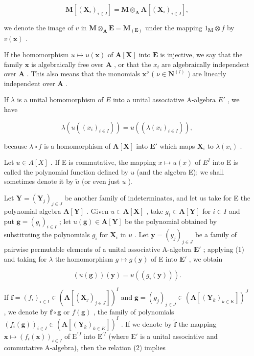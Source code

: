 \[
\mathbf {M} [ (\mathbf {X} _ {i}) _ {i \in I} ] = \mathbf {M} \otimes_ {\mathbf {A}} \mathbf {A} [ (\mathbf {X} _ {i}) _ {i \in I} ],
\]

we denote the image of \(v\) in \(\mathbf{M} \otimes_{\mathbf{A}} \mathbf{E} = \mathbf{M}_{(\mathbf{E})}\) under the mapping \(1_{\mathbf{M}} \otimes f\) by \(v(\mathbf{x})\) .

If the homomorphism \(u \mapsto u(\mathbf{x})\) of \(\mathbf{A}[\mathbf{X}]\) into \(\mathbf{E}\) is injective, we say that the family \(\mathbf{x}\) is algebraically free over \(\mathbf{A}\) , or that the \(x_i\) are algebraically independent over \(\mathbf{A}\) . This also means that the monomials \(\mathbf{x}^\nu\) ( \(\nu \in \mathbf{N}^{(I)}\) ) are linearly independent over \(\mathbf{A}\) .

If \(\lambda\) is a unital homomorphism of \(E\) into a unital associative A-algebra \(E'\) , we have

\[
\lambda \left(u \left(\left(x _ {i}\right) _ {i \in I}\right)\right) = u \left(\left(\lambda \left(x _ {i}\right) _ {i \in I}\right)\right),\tag{1}
\]

because \(\lambda \circ f\) is a homomorphism of \(\mathbf{A}[\mathbf{X}]\) into \(\mathbf{E}'\) which maps \(\mathbf{X}_i\) to \(\lambda(x_i)\) .

Let \(u \in A[X]\) . If E is commutative, the mapping \(x \mapsto u(x)\) of \(E^{I}\) into E is called the polynomial function defined by \(u\) (and the algebra E); we shall sometimes denote it by \(\tilde{u}\) (or even just \(u\) ).

Let \(\mathbf{Y} = (\mathbf{Y}_j)_{j\in J}\) be another family of indeterminates, and let us take for E the polynomial algebra \(\mathbf{A}[\mathbf{Y}]\) . Given \(u\in \mathbf{A}[\mathbf{X}]\) , take \(g_{i}\in \mathbf{A}[\mathbf{Y}]\) for \(i\in I\) and put \(\mathbf{g} = (g_i)_{i\in I}\) ; let \(u(\mathbf{g})\in \mathbf{A}[\mathbf{Y}]\) be the polynomial obtained by substituting the polynomials \(g_{i}\) for \(\mathbf{X}_i\) in \(u\) . Let \(\mathbf{y} = (y_j)_{j\in J}\) be a family of pairwise permutable elements of a unital associative A-algebra \(\mathbf{E}'\) ; applying (1) and taking for \(\lambda\) the homomorphism \(g\mapsto g(\mathbf{y})\) of E into \(\mathbf{E}'\) , we obtain

\[
(u (\mathbf {g})) (\mathbf {y}) = u \left(\left(g _ {i} (\mathbf {y})\right)\right).\tag{2}
\]

If \(\mathbf{f} = (f_i)_{i\in I}\in (\mathbf{A}[(\mathbf{X}_j)_{j\in J}])^I\) and \(\mathbf{g} = (g_j)_{j\in J}\in (\mathbf{A}[(\mathbf{Y}_k)_{k\in K}])^J\) , we denote by \(\mathbf{f}\circ \mathbf{g}\) or \(f(\mathbf{g})\) , the family of polynomials \((f_i(\mathbf{g}))_{i\in I}\in (\mathbf{A}[(\mathbf{Y}_k)_{k\in K}])^I\) . If we denote by \(\tilde{\mathbf{f}}\) the mapping \(\mathbf{x} \mapsto (f_i(\mathbf{x}))_{i \in I}\) of \(\mathrm{E}^{\prime J}\) into \(\mathrm{E}^{\prime I}\) (where \(\mathrm{E}'\) is a unital associative and commutative A-algebra), then the relation (2) implies

